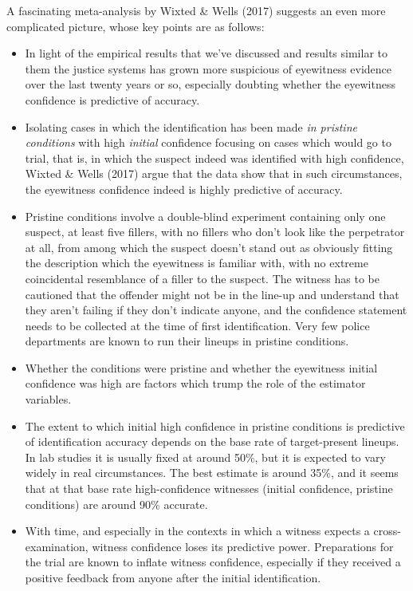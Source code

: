 \documentclass[
  10pt,
  dvipsnames,enabledeprecatedfontcommands]{scrartcl}
\begin{document}
A fascinating meta-analysis by Wixted \& Wells (2017) suggests an even
more complicated picture, whose key points are as follows:

\begin{itemize}
\item
  In light of the empirical results that we've discussed and results
  similar to them the justice systems has grown more suspicious of
  eyewitness evidence over the last twenty years or so, especially
  doubting whether the eyewitness confidence is predictive of accuracy.
\item
  Isolating cases in which the identification has been made
  \emph{in pristine conditions} with high \emph{initial} confidence
  focusing on cases which would go to trial, that is, in which the
  suspect indeed was identified with high confidence, Wixted \& Wells
  (2017) argue that the data show that in such circumstances, the
  eyewitness confidence indeed is highly predictive of accuracy.
\item
  Pristine conditions involve a double-blind experiment containing only
  one suspect, at least five fillers, with no fillers who don't look
  like the perpetrator at all, from among which the suspect doesn't
  stand out as obviously fitting the description which the eyewitness is
  familiar with, with no extreme coincidental resemblance of a filler to
  the suspect. The witness has to be cautioned that the offender might
  not be in the line-up and understand that they aren't failing if they
  don't indicate anyone, and the confidence statement needs to be
  collected at the time of first identification. Very few police
  departments are known to run their lineups in pristine conditions.
\item
  Whether the conditions were pristine and whether the eyewitness
  initial confidence was high are factors which trump the role of the
  estimator variables.
\item
  The extent to which initial high confidence in pristine conditions is
  predictive of identification accuracy depends on the base rate of
  target-present lineups. In lab studies it is usually fixed at around
  50\%, but it is expected to vary widely in real circumstances. The
  best estimate is around 35\%, and it seems that at that base rate
  high-confidence witnesses (initial confidence, pristine conditions)
  are around 90\% accurate.
\item
  With time, and especially in the contexts in which a witness expects a
  cross-examination, witness confidence loses its predictive power.
  Preparations for the trial are known to inflate witness confidence,
  especially if they received a positive feedback from anyone after the
  initial identification.
\end{itemize}
\end{document}
